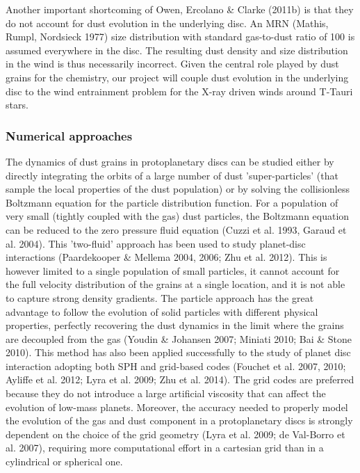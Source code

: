 \documentclass[10pt,fleqn,twoside]{article}
\begin{document}
Another important shortcoming of Owen, Ercolano \& Clarke (2011b) is
that they do not account for dust evolution in the underlying disc. An
MRN (Mathis, Rumpl, Nordsieck 1977) size distribution with standard gas-to-dust ratio of 100 is
assumed everywhere in the disc. The resulting dust density and size
distribution in the wind is thus necessarily incorrect. Given the
central role played by dust grains for the chemistry, our project will
couple dust evolution in the underlying disc to the wind entrainment
problem for the X-ray driven winds around T-Tauri stars.  

\subsubsection*{Numerical approaches}

The dynamics of dust grains in protoplanetary discs can be studied
either by directly integrating the orbits of a large number of dust
'super-particles' (that sample the local properties of the dust
population) or by solving the collisionless Boltzmann equation for the
particle distribution function. For a population of very small
(tightly coupled with the gas) dust particles, the Boltzmann equation
can be reduced to the zero pressure fluid equation (Cuzzi et al. 1993,
Garaud et al. 2004). This 'two-fluid' approach has been used to study
planet-disc interactions (Paardekooper \& Mellema 2004, 2006; Zhu et
al. 2012). This is however limited to a single population of
small particles, it cannot account for the full velocity distribution
of the grains at a single location, and it is not able to capture
strong density gradients. The particle approach has the great
advantage to follow the evolution of solid particles with different
physical properties, perfectly recovering the dust dynamics in the
limit where the grains are decoupled from the gas (Youdin \& Johansen
2007; Miniati 2010; Bai \& Stone 2010). This method has also been
applied successfully to the study of planet disc interaction adopting
both SPH and grid-based codes (Fouchet et al. 2007, 2010; Ayliffe et
al. 2012; Lyra et al. 2009; Zhu et al. 2014). The grid codes are
preferred because they do not introduce a large artificial viscosity
that can affect the evolution of low-mass planets. Moreover, the
accuracy needed to properly model the evolution of the gas and dust
component in a protoplanetary discs is strongly dependent on the
choice of the grid geometry (Lyra et al. 2009; de Val-Borro et
al. 2007), requiring more computational effort in a cartesian grid
than in a cylindrical or spherical one. 
\end{document}

